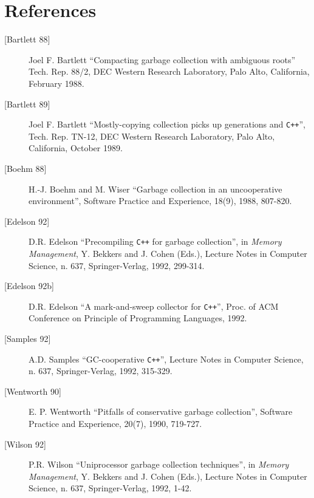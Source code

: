 \section{References}
\begin{description}
\item [{[Bartlett 88]}] Joel F. Bartlett  ``Compacting garbage collection with
ambiguous roots''  Tech. Rep.  88/2, DEC Western Research Laboratory,
Palo Alto, California, February 1988.
\item [{[Bartlett 89]}] Joel F. Bartlett  ``Mostly-copying collection picks up generations and {\tt C++}'', 
Tech.  Rep.  TN-12, DEC Western Research Laboratory, Palo Alto,
California, October 1989.
\item [{[Boehm 88]}]    H.-J. Boehm and M. Wiser  ``Garbage collection in an uncooperative
environment'',  Software Practice and Experience, 18(9), 1988, 807-820.
\item [{[Edelson 92]}]  D.R. Edelson  ``Precompiling {\tt C++} for garbage collection'', in {\em Memory Management}, Y. Bekkers and J. Cohen (Eds.), Lecture Notes in Computer
Science, n. 637, Springer-Verlag, 1992, 299-314.
\item [{[Edelson 92b]}] D.R. Edelson  ``A mark-and-sweep collector for {\tt C++}'',  Proc. of ACM
Conference on Principle of Programming Languages, 1992.
\item [{[Samples 92]}]  A.D. Samples  ``GC-cooperative {\tt C++}'',  Lecture Notes in Computer
Science, n. 637, Springer-Verlag, 1992, 315-329.
\item [{[Wentworth 90]}]        E. P. Wentworth  ``Pitfalls of conservative garbage collection'',  Software
Practice and Experience, 20(7), 1990, 719-727.
\item [{[Wilson 92]}]   P.R. Wilson  ``Uniprocessor garbage collection techniques'', in {\em Memory
Management}, Y. Bekkers and J. Cohen (Eds.), Lecture Notes in Computer
Science, n.  637, Springer-Verlag, 1992, 1-42.
\end{description}


